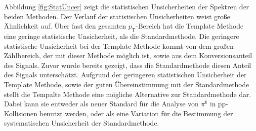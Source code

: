 \newline
Abbildung \ref{fig:StatUncer} zeigt die statistischen Unsicherheiten der Spektren der beiden Methoden.
Der Verlauf der statistischen Unsicherheiten weist große Ähnlichkeit auf.
Über fast den gesamten $p_\text{T}$-Bereich hat die Template Methode eine geringe statistische Unsicherheit, als die Standardmethode.
Die geringere statistische Unsicherheit bei der Template Methode kommt von dem großen Zählbereich, der mit  dieser Methode möglich ist, sowie aus dem Konversionsanteil des Signals.
Zuvor wurde bereits gezeigt, dass die Standardmethode diesen Anteil des Signals unterschätzt.
\newline
Aufgrund der geringeren statistischen Unsicherheit der Template Methode, sowie der guten Über\-ein\-stim\-mung mit der Standardmethode stellt die Tempalte Methode eine mögliche Alternative zur Standardmethode dar.
Dabei kann sie entweder als neuer Standard für die Analyse von $\pi^{0}$ in pp-Kollisionen benutzt werden, oder als eine Variation für die Bestimmung der systematischen Unsicherheit der Standardmethode.
